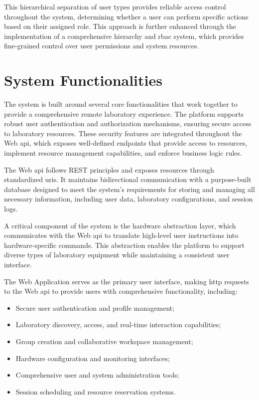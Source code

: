This hierarchical separation of user types provides reliable access control throughout the system, determining whether a user can perform specific actions based on their assigned role. This approach is further enhanced through the implementation of a comprehensive hierarchy and \ac{rbac} system, which provides fine-grained control over user permissions and system resources.

\section{System Functionalities}\label{sec:system_functionalities}
The system is built around several core functionalities that work together to provide a comprehensive remote laboratory experience. The platform supports robust user authentication and authorization mechanisms, ensuring secure access to laboratory resources. These security features are integrated throughout the Web \ac{api}, which exposes well-defined endpoints that provide access to resources, implement resource management capabilities, and enforce business logic rules.

The Web \ac{api} follows REST principles and exposes resources through standardized \acp{uri}. It maintains bidirectional communication with a purpose-built database designed to meet the system's requirements for storing and managing all necessary information, including user data, laboratory configurations, and session logs.

A critical component of the system is the hardware abstraction layer, which communicates with the Web \ac{api} to translate high-level user instructions into hardware-specific commands. This abstraction enables the platform to support diverse types of laboratory equipment while maintaining a consistent user interface.

The Web Application serves as the primary user interface, making \ac{http} requests to the Web \ac{api} to provide users with comprehensive functionality, including:

\begin{itemize}
    \item Secure user authentication and profile management;
    \item Laboratory discovery, access, and real-time interaction capabilities;
    \item Group creation and collaborative workspace management;
    \item Hardware configuration and monitoring interfaces;
    \item Comprehensive user and system administration tools;
    \item Session scheduling and resource reservation systems.
\end{itemize}

